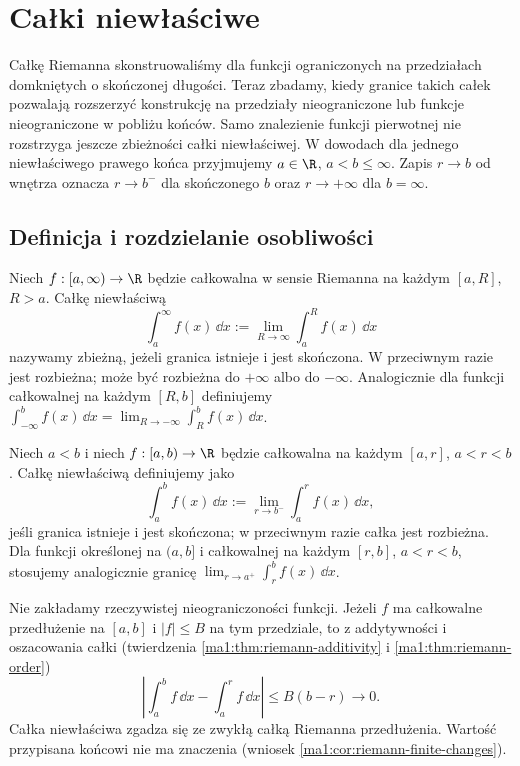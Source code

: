 \chapter{Całki niewłaściwe}
\label{ma1:ch:improper-integrals}

Całkę Riemanna skonstruowaliśmy dla funkcji ograniczonych na przedziałach domkniętych o skończonej długości. Teraz zbadamy, kiedy granice takich całek pozwalają rozszerzyć konstrukcję na przedziały nieograniczone lub funkcje nieograniczone w pobliżu końców. Samo znalezienie funkcji pierwotnej nie rozstrzyga jeszcze zbieżności całki niewłaściwej. W dowodach dla jednego niewłaściwego prawego końca przyjmujemy $a\in\R$, $a<b\le\infty$. Zapis $r\to b$ od wnętrza oznacza $r\to b^-$ dla skończonego $b$ oraz $r\to+\infty$ dla $b=\infty$.

\section{Definicja i rozdzielanie osobliwości}
\begin{definicja}
\label{ma1:def:improper-infinite}
Niech $f:[a,\infty)\to\R$ będzie całkowalna w sensie Riemanna na każdym $[a,R]$, $R>a$. Całkę niewłaściwą
\[
 \int_a^\infty f(x)\,\dd x
 :=\lim_{R\to\infty}\int_a^R f(x)\,\dd x
\]
nazywamy zbieżną, jeżeli granica istnieje i jest skończona. W przeciwnym razie jest rozbieżna; może być rozbieżna do $+\infty$ albo do $-\infty$. Analogicznie dla funkcji całkowalnej na każdym $[R,b]$ definiujemy $\int_{-\infty}^b f(x)\,\dd x=\lim_{R\to-\infty}\int_R^b f(x)\,\dd x$.
\end{definicja}
\begin{definicja}
\label{ma1:def:improper-finite}
Niech $a<b$ i niech $f:[a,b)\to\R$ będzie całkowalna na każdym $[a,r]$, $a<r<b$. Całkę niewłaściwą definiujemy jako
\[
 \int_a^b f(x)\,\dd x:=\lim_{r\to b^-}\int_a^r f(x)\,\dd x,
\]
jeśli granica istnieje i jest skończona; w przeciwnym razie całka jest rozbieżna. Dla funkcji określonej na $(a,b]$ i całkowalnej na każdym $[r,b]$, $a<r<b$, stosujemy analogicznie granicę $\lim_{r\to a^+}\int_r^b f(x)\,\dd x$.
\end{definicja}
Nie zakładamy rzeczywistej nieograniczoności funkcji. Jeżeli $f$ ma całkowalne przedłużenie na $[a,b]$ i $|f|\le B$ na tym przedziale, to z addytywności i oszacowania całki (twierdzenia \ref{ma1:thm:riemann-additivity} i \ref{ma1:thm:riemann-order})
\[
 \left|\int_a^b f\,\dd x-\int_a^r f\,\dd x\right|
 \le B(b-r)\longrightarrow0.
\]
Całka niewłaściwa zgadza się ze zwykłą całką Riemanna przedłużenia. Wartość przypisana końcowi nie ma znaczenia (wniosek \ref{ma1:cor:riemann-finite-changes}).


